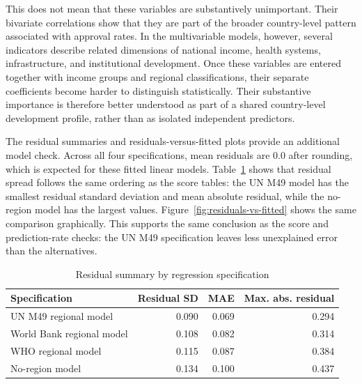 \documentclass[runningheads]{llncs}
\begin{document}
This does not mean that these variables are substantively unimportant. Their bivariate correlations show that they are part of the broader country-level pattern associated with approval rates. In the multivariable models, however, several indicators describe related dimensions of national income, health systems, infrastructure, and institutional development. Once these variables are entered together with income groups and regional classifications, their separate coefficients become harder to distinguish statistically. Their substantive importance is therefore better understood as part of a shared country-level development profile, rather than as isolated independent predictors.

The residual summaries and residuals-versus-fitted plots provide an additional model check. Across all four specifications, mean residuals are 0.0 after rounding, which is expected for these fitted linear models. Table~\ref{tab:residual-summary-by-model} shows that residual spread follows the same ordering as the score tables: the UN M49 model has the smallest residual standard deviation and mean absolute residual, while the no-region model has the largest values. Figure~\ref{fig:residuals-vs-fitted} shows the same comparison graphically. This supports the same conclusion as the score and prediction-rate checks: the UN M49 specification leaves less unexplained error than the alternatives.

\begin{table}
\caption{Residual summary by regression specification}
\label{tab:residual-summary-by-model}
\centering
\renewcommand{\arraystretch}{1.2}
\setlength{\tabcolsep}{6pt}
\begin{tabular}{lrrr}
\hline
Specification & Residual SD & MAE & Max. abs. residual \\
\hline
UN M49 regional model & 0.090 & 0.069 & 0.294 \\
World Bank regional model & 0.108 & 0.082 & 0.314 \\
WHO regional model & 0.115 & 0.087 & 0.384 \\
No-region model & 0.134 & 0.100 & 0.437 \\
\hline
\end{tabular}
\end{table}
\end{document}
